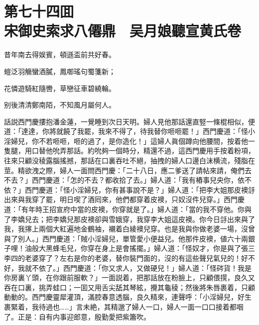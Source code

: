
\chapter*{第七十四囬　\\宋御史索求八僊鼎　吴月娘聽宣黄氏卷}


\begin{myquote}
昔年南去得娱賓，頓遜盃前共好春。

螘泛羽觴蠻酒膩，鳳啣瑤句蜀箋新；

花憐遊騎紅隨轡，草戀征車碧繞輪。

别後清清鄭南陌，不知風月屬何人。
\end{myquote}

話説西門慶摟抱潘金蓮，一覺睡到次日天明。婦人見他那話還直竪一條棍相似，便道：「達達，你將就饒了我罷，我來不得了，待我替你咂咂罷！」西門慶道：「怪小淫婦兒，你不若咂咂，咂的過了，是你造化！」這婦人眞個蹲向他腰間，按着他一隻腿，用口替他吮弄那話。約吮夠一個時分，精還不過，這西門慶用手按着粉項，往來只顧没稜露腦搖撼，那話在口裏吞吐不絕，抽拽的婦人口邊白沫横流，殘脂在莖。精欲洩之際，婦人一面問西門慶：「二十八日，應二爹送了請帖來請，俺們去不去？」西門慶道：「怎的不去？都收拾了去。」婦人道：「我有樁事兒央你，依不依？」西門慶道：「怪小淫婦兒，你有甚事說不是？」婦人道：「把李大姐那皮襖㧱出來與我穿了罷，明日喫了酒囘來，他們都穿着皮襖，只奴沒件兒穿。」西門慶道：「有年時王招宣府中當的皮襖，你穿就是了。」婦人道：「當的我不穿他。你與了李嬌兒去；把李嬌兒那皮襖卻與雪娥穿，我穿李大姐這皮襖。你今日㧱出來與了我，我㩟上兩個大紅遍地金鶴袖，襯着白綾襖兒穿。也是我與你做老婆一場，沒曾與了別人。」西門慶道：「賊小淫婦兒，單管愛小便益兒。他那件皮襖，値六十兩銀子哩！油般大黑蜂毛兒，你穿在身上是會搖擺。」婦人道：「怪奴才，你是與了張三李四的老婆穿了？左右是你的老婆，替你裝門面的，沒的有這些聲兒氣兒的！好不好，我就不依了。」西門慶道：「你又求人，又做硬兒！」婦人道：「怪硶貨！我是你房裏丫頭，在你跟前服軟？」一面説着，把那話放在粉臉上，只顧偎㨪，良久又吞在口裏，挑弄蛙口；一囬又用舌尖舐其琴絃，攪其龜稜；然後將朱唇裹着，只顧動動的。西門慶靈犀灌頂，滿腔春意透腦，良久精來，連聲呼：「小淫婦兒，好生裹緊着，我待過也……」言未絶，其精邈了婦人一口，婦人一面一口口接着都咽了。正是：自有内事迎郎意，殷勤愛把紫簫吹。

